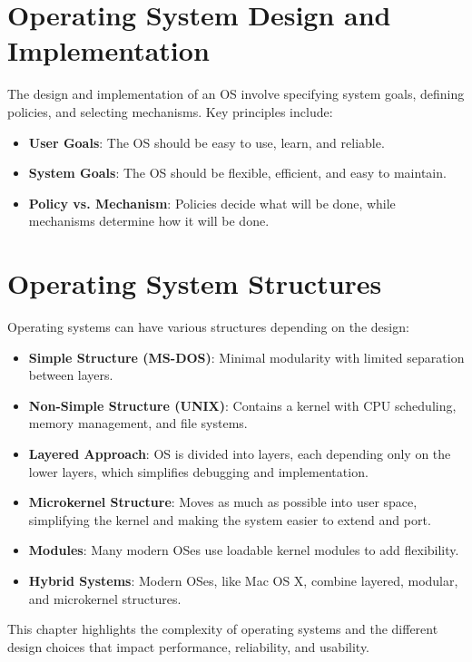 \documentclass{article}
\begin{document}
\section{Operating System Design and Implementation}
The design and implementation of an OS involve specifying system goals, defining policies, and selecting mechanisms. Key principles include:
\begin{itemize}
    \item \textbf{User Goals}: The OS should be easy to use, learn, and reliable.
    \item \textbf{System Goals}: The OS should be flexible, efficient, and easy to maintain.
    \item \textbf{Policy vs. Mechanism}: Policies decide what will be done, while mechanisms determine how it will be done.
\end{itemize}

\section{Operating System Structures}
Operating systems can have various structures depending on the design:
\begin{itemize}
    \item \textbf{Simple Structure (MS-DOS)}: Minimal modularity with limited separation between layers.
    \item \textbf{Non-Simple Structure (UNIX)}: Contains a kernel with CPU scheduling, memory management, and file systems.
    \item \textbf{Layered Approach}: OS is divided into layers, each depending only on the lower layers, which simplifies debugging and implementation.
    \item \textbf{Microkernel Structure}: Moves as much as possible into user space, simplifying the kernel and making the system easier to extend and port.
    \item \textbf{Modules}: Many modern OSes use loadable kernel modules to add flexibility.
    \item \textbf{Hybrid Systems}: Modern OSes, like Mac OS X, combine layered, modular, and microkernel structures.
\end{itemize}

This chapter highlights the complexity of operating systems and the different design choices that impact performance, reliability, and usability.
\end{document}
